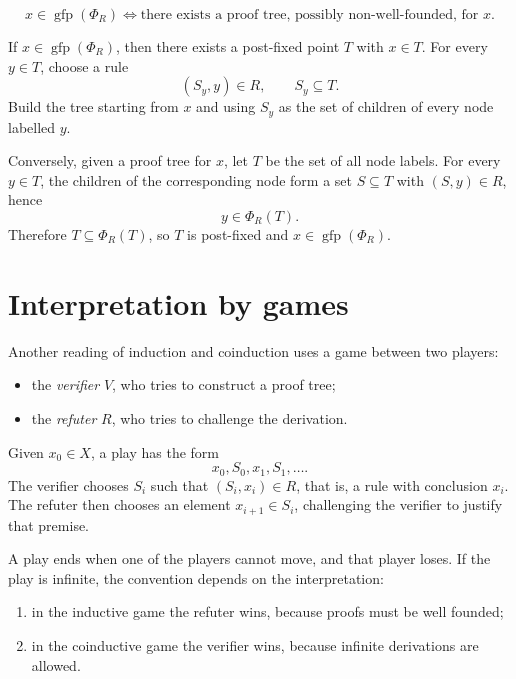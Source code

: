 \documentclass[a4paper]{article}
\newcommand{\gfp}{\operatorname{gfp}}
\begin{document}
\begin{snippettheorem}{}
    \[
        x\in\gfp(\Phi_R)
        \iff
        \text{there exists a proof tree, possibly non-well-founded, for \(x\)}.
    \]
\end{snippettheorem}

\begin{snippetproof}{}
    If \(x\in\gfp(\Phi_R)\), then there exists a post-fixed point \(T\) with \(x\in T\).
    For every \(y\in T\), choose a rule
    \[
        (S_y,y)\in R,
        \qquad
        S_y\subseteq T.
    \]
    Build the tree starting from \(x\) and using \(S_y\) as the set of children of every node labelled \(y\).

    Conversely, given a proof tree for \(x\), let \(T\) be the set of all node labels.
    For every \(y\in T\), the children of the corresponding node form a set \(S\subseteq T\) with \((S,y)\in R\), hence
    \[
        y\in\Phi_R(T).
    \]
    Therefore \(T\subseteq\Phi_R(T)\), so \(T\) is post-fixed and \(x\in\gfp(\Phi_R)\).
\end{snippetproof}

\section{Interpretation by games}

Another reading of induction and coinduction uses a game between two players:
\begin{itemize}
    \item the \emph{verifier} \(V\), who tries to construct a proof tree;
    \item the \emph{refuter} \(R\), who tries to challenge the derivation.
\end{itemize}

Given \(x_0\in X\), a play has the form
\[
    x_0,S_0,x_1,S_1,\ldots.
\]
The verifier chooses \(S_i\) such that \((S_i,x_i)\in R\), that is, a rule with conclusion \(x_i\).
The refuter then chooses an element \(x_{i+1}\in S_i\), challenging the verifier to justify that premise.

A play ends when one of the players cannot move, and that player loses.
If the play is infinite, the convention depends on the interpretation:
\begin{enumerate}
    \item in the inductive game the refuter wins, because proofs must be well founded;
    \item in the coinductive game the verifier wins, because infinite derivations are allowed.
\end{enumerate}
\end{document}
